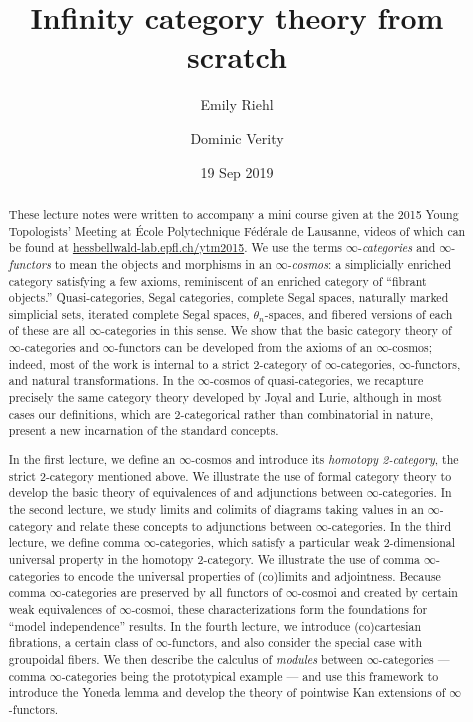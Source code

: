 \documentclass[12pt,reqno]{amsart}
\date{19 Sep 2019}
\title{Infinity category theory from scratch}
\author[Riehl]{Emily Riehl}
\author[Verity]{Dominic Verity}
\theoremstyle{plain}
\theoremstyle{definition}
\theoremstyle{remark}
\numberwithin{equation}{subsection}
\begin{document}
  
  \ifpdf
  \else
  \fi
  
\begin{abstract} 
These lecture notes were written to accompany a mini course given at the 2015 Young Topologists' Meeting at \'{E}cole Polytechnique F\'{e}d\'{e}rale de Lausanne, videos of which can be found at  \href{http://hessbellwald-lab.epfl.ch/ytm2015}{hessbellwald-lab.epfl.ch/ytm2015}. We use the terms $\infty$-\emph{categories} and $\infty$-\emph{functors} to mean the objects and morphisms in an $\infty$-\emph{cosmos}: a simplicially enriched category satisfying a few axioms, reminiscent of an enriched category of ``fibrant objects.'' Quasi-categories, Segal categories, complete Segal spaces, naturally marked simplicial sets, iterated complete Segal spaces, $\theta_n$-spaces, and fibered versions of each of these are all $\infty$-categories in this sense. We show that the basic category theory of $\infty$-categories and $\infty$-functors can be developed from the axioms of an $\infty$-cosmos; indeed, most of the work is internal to a strict 2-category of $\infty$-categories, $\infty$-functors, and natural transformations. In the $\infty$-cosmos of quasi-categories, we recapture precisely the same category theory developed by Joyal and Lurie, although in most cases our definitions, which are 2-categorical rather than combinatorial in nature, present a new incarnation of the standard concepts.

In the first lecture, we define an $\infty$-cosmos and introduce its \emph{homotopy 2-category}, the strict 2-category mentioned above. We illustrate the use of formal category theory to develop the basic theory of equivalences of and adjunctions between $\infty$-categories. In the second lecture, we study limits and colimits of diagrams taking values in an $\infty$-category and relate these concepts to adjunctions between $\infty$-categories. In the third lecture, we define comma $\infty$-categories, which satisfy a particular weak 2-dimensional universal property in the homotopy 2-category. We illustrate the use of comma $\infty$-categories to encode the universal properties of (co)limits and adjointness. Because comma $\infty$-categories are preserved by all functors of $\infty$-cosmoi and created by certain weak equivalences of $\infty$-cosmoi, these characterizations form the foundations for ``model independence'' results. In the fourth lecture, we introduce (co)cartesian fibrations, a certain class of $\infty$-functors, and also consider the special case with groupoidal fibers. We then describe the calculus of \emph{modules} between $\infty$-categories ---  comma $\infty$-categories being the prototypical example --- and use this framework to introduce the Yoneda lemma and develop the theory of pointwise Kan extensions of $\infty$-functors.
\end{abstract}
  
\end{document}

